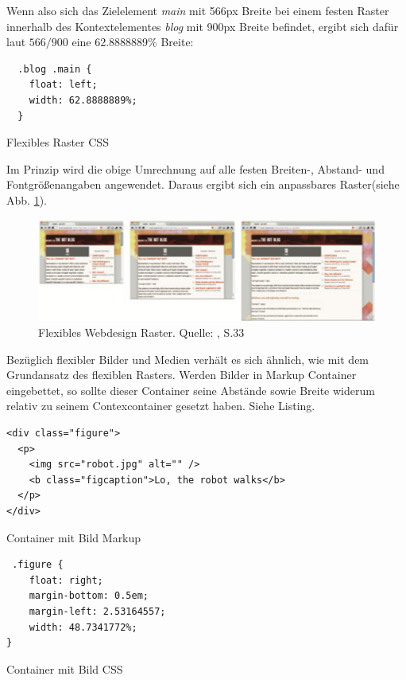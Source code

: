 Wenn also sich das Zielelement \emph{main} mit 566px Breite bei einem festen Raster innerhalb des Kontextelementes \emph{blog} mit 900px Breite befindet, ergibt sich dafür laut $566 / 900$ eine 62.8888889\% Breite:

\begin{listing}[H]
\begin{verbatim}
  .blog .main {
    float: left;
    width: 62.8888889%;
  }
\end{verbatim}
\caption{Flexibles Raster CSS}
\label{lst:flex_grid_css}
\end{listing}

Im Prinzip wird die obige Umrechnung auf alle festen Breiten-, Abstand- und Fontgrößenangaben angewendet. Daraus ergibt sich ein anpassbares Raster(siehe Abb. \ref{fig:flex_grid}).

\begin{figure}[htp]     %
\centering
\includegraphics[width=1.0\textwidth]{images/flex_grid}
\caption{Flexibles Webdesign Raster. Quelle: \cite{Marcotte:2011}, S.33}\label{fig:flex_grid}
\end{figure}

Bezüglich flexibler Bilder und Medien verhält es sich ähnlich, wie mit dem Grundansatz des flexiblen Rasters. Werden Bilder in Markup Container eingebettet, so sollte dieser Container seine Abstände sowie Breite widerum relativ zu seinem Contexcontainer gesetzt haben. Siehe Listing.

\begin{listing}[H]
\begin{verbatim}
<div class="figure">
  <p>
    <img src="robot.jpg" alt="" />
    <b class="figcaption">Lo, the robot walks</b>
  </p>
</div>
\end{verbatim}
\caption{Container mit Bild Markup}
\label{lst:image_container_markup}
\end{listing}

\begin{listing}[H]
\begin{verbatim}
 .figure {
    float: right;
    margin-bottom: 0.5em;
    margin-left: 2.53164557;
    width: 48.7341772%;
}
\end{verbatim}
\caption{Container mit Bild CSS}
\label{lst:image_container_css}
\end{listing}


